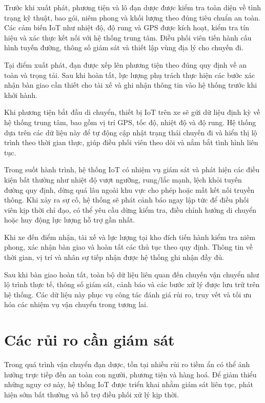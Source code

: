 Trước khi xuất phát, phương tiện và lô đạn dược được kiểm tra toàn diện về tình trạng kỹ thuật, bao gói, niêm phong và khối lượng theo đúng tiêu chuẩn an toàn. Các cảm biến IoT như nhiệt độ, độ rung và GPS được kích hoạt, kiểm tra tín hiệu và xác thực kết nối với hệ thống trung tâm. Điều phối viên tiến hành cấu hình tuyến đường, thông số giám sát và thiết lập vùng địa lý cho chuyến đi.

Tại điểm xuất phát, đạn được xếp lên phương tiện theo đúng quy định về an toàn và trọng tải. Sau khi hoàn tất, lực lượng phụ trách thực hiện các bước xác nhận bàn giao cần thiết cho tài xế và ghi nhận thông tin vào hệ thống trước khi khởi hành. 

Khi phương tiện bắt đầu di chuyển, thiết bị IoT trên xe sẽ gửi dữ liệu định kỳ về hệ thống trung tâm, bao gồm vị trí GPS, tốc độ, nhiệt độ và độ rung. Hệ thống dựa trên các dữ liệu này để tự động cập nhật trạng thái chuyến đi và hiển thị lộ trình theo thời gian thực, giúp điều phối viên theo dõi và nắm bắt tình hình liên tục.

Trong suốt hành trình, hệ thống IoT có nhiệm vụ giám sát và phát hiện các điều kiện bất thường như nhiệt độ vượt ngưỡng, rung/lắc mạnh, lệch khỏi tuyến đường quy định, dừng quá lâu ngoài khu vực cho phép hoặc mất kết nối truyền thông. Khi xảy ra sự cố, hệ thống sẽ phát cảnh báo ngay lập tức để điều phối viên kịp thời chỉ đạo, có thể yêu cầu dừng kiểm tra, điều chỉnh hướng di chuyển hoặc huy động lực lượng hỗ trợ gần nhất.

Khi xe đến điểm nhận, tài xế và lực lượng tại kho đích tiến hành kiểm tra niêm phong, xác nhận bàn giao và hoàn tất các thủ tục theo quy định. Thông tin về thời gian, vị trí và nhân sự tiếp nhận được hệ thống ghi nhận đầy đủ.

Sau khi bàn giao hoàn tất, toàn bộ dữ liệu liên quan đến chuyến vận chuyển như lộ trình thực tế, thông số giám sát, cảnh báo và các bước xử lý được lưu trữ trên hệ thống. Các dữ liệu này phục vụ công tác đánh giá rủi ro, truy vết và tối ưu hóa các nhiệm vụ vận chuyển trong tương lai.

\section{Các rủi ro cần giám sát}
Trong quá trình vận chuyển đạn dược, tồn tại nhiều rủi ro tiềm ẩn có thể ảnh hưởng trực tiếp đến an toàn con người, phương tiện và hàng hoá. Để giảm thiểu những nguy cơ này, hệ thống IoT được triển khai nhằm giám sát liên tục, phát hiện sớm bất thường và hỗ trợ điều phối xử lý kịp thời. 

